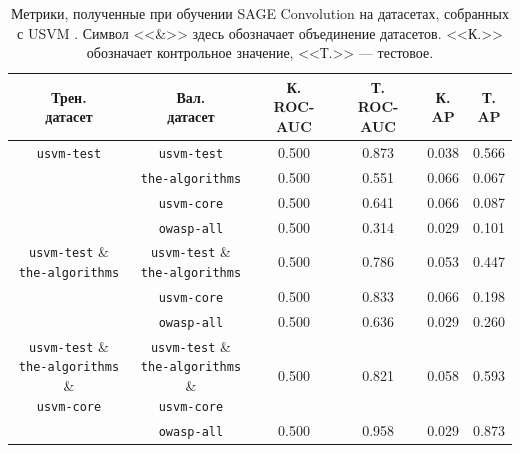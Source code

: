 \begin{table}[ht]
\begin{center}
\begin{tabular}{c|c||cc|cc}
    \makecell{Трен. \\ датасет} & \makecell{Вал. \\ датасет} & \makecell{К. \\ \textsc{ROC-AUC}} & \makecell{Т. \\ \textsc{ROC-AUC}} & \makecell{К. \\ \textsc{AP}} & \makecell{Т. \\ \textsc{AP}} \\
    \hline \hline
    \rule{0pt}{2.5ex}
    \texttt{usvm-test} & \texttt{usvm-test}      & 0.500 & 0.873 & 0.038 & 0.566 \\
    \cline{2-6}
    \rule{0pt}{2.5ex}
                       & \texttt{the-algorithms} & 0.500 & 0.551 & 0.066 & 0.067 \\
    \cline{2-6}
    \rule{0pt}{2.5ex}
                       & \texttt{usvm-core}      & 0.500 & 0.641 & 0.066 & 0.087 \\
    \cline{2-6}
    \rule{0pt}{2.5ex}
                       & \texttt{owasp-all}      & 0.500 & 0.314 & 0.029 & 0.101 \\
    \hline
    \makecell{
        \texttt{usvm-test} \& \\
        \texttt{the-algorithms}
    } & \makecell{
        \texttt{usvm-test} \& \\
        \texttt{the-algorithms}
    }                      & 0.500 & 0.786 & 0.053 & 0.447 \\
    \cline{2-6}
    \rule{0pt}{2.5ex}
      & \texttt{usvm-core} & 0.500 & 0.833 & 0.066 & 0.198 \\
    \cline{2-6}
    \rule{0pt}{2.5ex}
      & \texttt{owasp-all} & 0.500 & 0.636 & 0.029 & 0.260 \\
    \hline
    \makecell{
        \texttt{usvm-test} \& \\
        \texttt{the-algorithms} \& \\
        \texttt{usvm-core}
    } & \makecell{
        \texttt{usvm-test} \& \\
        \texttt{the-algorithms} \& \\
        \texttt{usvm-core}
    }                      & 0.500 & 0.821 & 0.058 & 0.593 \\
    \cline{2-6}
    \rule{0pt}{2.5ex}
      & \texttt{owasp-all} & 0.500 & 0.958 & 0.029 & 0.873 \\
\end{tabular}
\caption{\label{usvm-train-ds-val-results} Метрики, полученные при обучении SAGE Convolution на датасетах, собранных с USVM \cite{usvm-diploma}. Символ <<\&>> здесь обозначает объединение датасетов. <<К.>> обозначает контрольное значение, <<Т.>> --- тестовое.}
\end{center}
\end{table}

